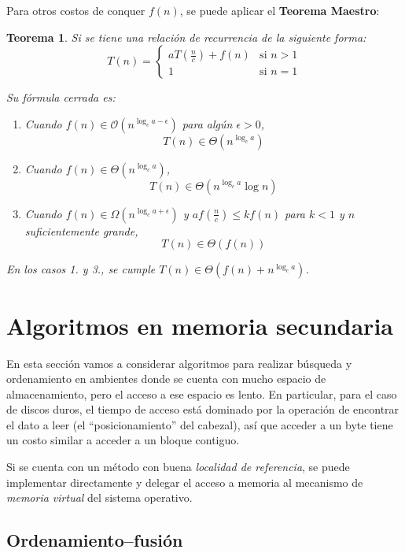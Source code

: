 \documentclass{article}
\newcommand{\BigO}[1]{{\mathcal{O}(#1)}}
\newcommand{\BigOmega}[1]{{\Omega(#1)}}
\newcommand{\BigTheta}[1]{{\Theta(#1)}}
\newtheorem*{theorem*}{Teorema}
\begin{document}
Para otros costos de conquer $f(n)$, se puede aplicar el \textbf{Teorema Maestro}:

\begin{theorem*}
    Si se tiene una relación de recurrencia de la siguiente forma:
    $$
    T(n) =
    \begin{cases}
        a T\left(\frac{n}{c}\right) + f(n) & \text{si } n > 1 \\
        1                       & \text{si } n = 1
    \end{cases}
    $$

    Su fórmula cerrada es:
    \begin{enumerate}
        \item Cuando $f(n) \in \BigO{n^{\log_c{a} - \epsilon}}$ para algún $\epsilon > 0$,
            $$T(n) \in \BigTheta{n^{\log_c{a}}}$$
        \item Cuando $f(n) \in \BigTheta{n^{\log_c{a}}}$,
            $$T(n) \in \BigTheta{n^{\log_c{a}} \log{n}}$$
        \item Cuando $f(n) \in \BigOmega{n^{\log_c{a} + \epsilon}}$ y $a f\left(\frac{n}{c}\right) \leq k f(n)$ para $k < 1$ y $n$ suficientemente grande,
            $$T(n) \in \BigTheta{f(n)}$$
    \end{enumerate}

    En los casos 1. y 3., se cumple $T(n) \in \BigTheta{f(n) + n^{\log_c{a}}}$.
\end{theorem*}

\section{Algoritmos en memoria secundaria}

En esta sección vamos a considerar algoritmos para realizar búsqueda y ordenamiento en ambientes donde se cuenta con mucho espacio de almacenamiento, pero el acceso a ese espacio es lento. En particular, para el caso de discos duros, el tiempo de acceso está dominado por la operación de encontrar el dato a leer (el ``posicionamiento'' del cabezal), así que acceder a un byte tiene un costo similar a acceder a un bloque contiguo.

Si se cuenta con un método con buena \textit{localidad de referencia}, se puede implementar directamente y delegar el acceso a memoria al mecanismo de \textit{memoria virtual} del sistema operativo.

\subsection{Ordenamiento--fusión}
\end{document}
